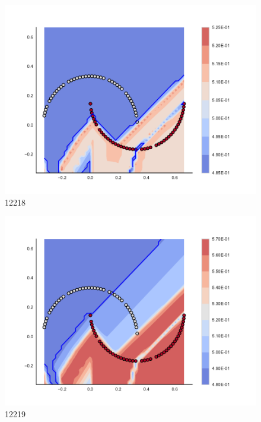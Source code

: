 \begin{subfigure}[b]{0.09\textwidth}
    \includegraphics[clip, trim=2.35cm 1.75cm 4.5cm 0cm,width=\textwidth]{img/convergence/12218.pdf}
    \caption{12218}
    \label{fig:convergence_12218}
\end{subfigure}
%
\begin{subfigure}[b]{0.09\textwidth}
    \includegraphics[clip, trim=2.35cm 1.75cm 4.5cm 0cm,width=\textwidth]{img/convergence/12219.pdf}
    \caption{12219}
    \label{fig:convergence_12219}
\end{subfigure}
%
